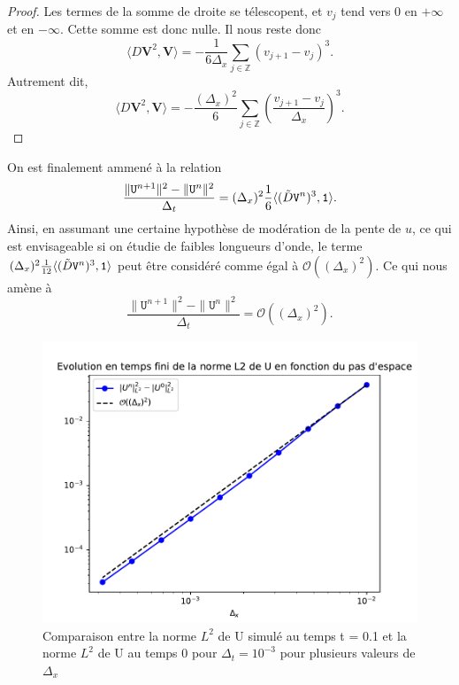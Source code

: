 \documentclass[12pt,a4paper]{article}
\numberwithin{equation}{section}
\begin{document}
\begin{proof}
    Les termes de la somme de droite se télescopent, et $v_j$ tend vers 0 en $+\infty$ et en $-\infty$. Cette somme est donc nulle. Il nous reste donc
    $$\langle D \textbf{V}^2 ,\textbf{V}\rangle  = -\frac{1}{6\Delta_x}\sum\limits_{j\in\mathbb{Z}}(v_{j+1} - v_j)^3 .$$    
    Autrement dit,
    $$\langle D \textbf{V}^2 ,\textbf{V}\rangle  = -\frac{(\Delta_x)^2}{6}\sum\limits_{j\in\mathbb{Z}}\left(\frac{v_{j+1} - v_j}{\Delta_x}\right)^3.$$
\end{proof}

On est finalement ammené à la relation 
\begin{equation*}
    \frac{\|\texttt{U}^{n+1}\|^2-\|\texttt{U}^{n}\|^2}{\Delta_t} = (\Delta_x)^2\frac{1}{6}\langle (\Tilde{D}\texttt{V}^n)^3 ,\texttt{1}\rangle  .
\end{equation*}
Ainsi, en assumant une certaine hypothèse de modération de la pente de $u$, ce qui est envisageable si on étudie de faibles longueurs d'onde, le terme  $(\Delta_x)^2\frac{1}{12}\langle (\Tilde{D}\texttt{V}^n)^3 ,\texttt{1}\rangle  $ peut être considéré comme égal à $\mathcal{O}((\Delta_x)^2)$. Ce qui nous amène à 
\begin{equation*}
    \frac{\|\texttt{U}^{n+1}\|^2-\|\texttt{U}^{n}\|^2}{\Delta_t} = \mathcal{O}((\Delta_x)^2).
\end{equation*}

\begin{figure}[H]
    \centering
    \includegraphics[scale=0.8]{graphs/OrdredenormeL2enfonctiondedx.pdf}
    \caption{Comparaison entre la norme $L^2$ de U simulé au temps t = 0.1 et la norme $L^2$ de U au temps 0 pour $\Delta_t = 10^{-3}$ pour plusieurs valeurs de $\Delta_x$ }
    \label{fig:enter-label}
\end{figure}
\end{document}
